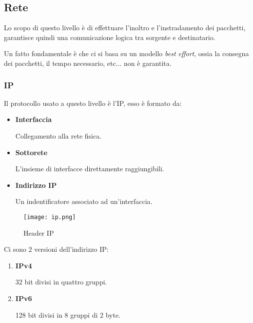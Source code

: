 \documentclass{article}
\begin{document}
\subsection{Rete}

Lo scopo di questo livello è di effettuare l'inoltro e l'instradamento dei pacchetti, garantisce quindi una comunicazione logica tra sorgente e destinatario.\newline

\noindent Un fatto fondamentale è che ci si basa su un modello \textit{best effort}, ossia la consegna dei pacchetti, il tempo necessario, etc$\ldots$ non è garantita.\newline

\subsubsection{IP}

\noindent Il protocollo usato a questo livello è l'IP, esso è formato da:
\begin{itemize}
    \item \textbf{Interfaccia}

        Collegamento alla rete fisica.

    \item \textbf{Sottorete}

        L'insieme di interfacce direttamente raggiungibili.

    \item \textbf{Indirizzo IP}

        Un indentificatore associato ad un'interfaccia.\newline
    
\end{itemize}

\begin{figure}[ht]
    \centering
    \texttt{[image: ip.png]}
    \caption{Header IP}
    \label{fig:h_ip}
\end{figure}

\noindent Ci sono 2 versioni dell'indirizzo IP:
\begin{enumerate}
    \item \textbf{IPv4}

        32 bit divisi in quattro gruppi.
    
    \item \textbf{IPv6}

        128 bit divisi in 8 gruppi di 2 byte.\newline
    
\end{enumerate}
\end{document}
